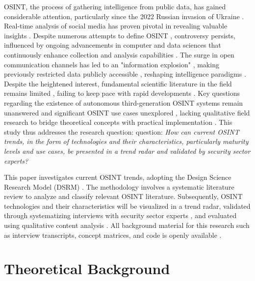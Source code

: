\documentclass[10pt]{article}
\begin{document}
OSINT, the process of gathering intelligence from public data, has gained considerable attention, particularly since
the 2022 Russian invasion of Ukraine \cite{DosPassos.2017}. Real-time analysis of social media has proven pivotal in revealing
valuable insights \cite{SmithBoyle.24.07.2023}. Despite numerous attempts to define OSINT
\cite{Hwang.2022, PastorGalindo.2020, Yogish.2021}, controversy persists, influenced by ongoing advancements in computer and
data sciences that continuously enhance collection and analysis capabilities \cite{Ghioni.2023, Williams.2018}.
The surge in open communication channels has led to an "information explosion" \cite{DosPassos.2017, Hwang.2022, Yogish.2021},
making previously restricted data publicly accessible \cite{Hwang.2022, Williams.2018}, reshaping intelligence paradigms \cite{Dokman.2020}.
Despite the heightened interest, fundamental scientific literature in the field remains limited \cite{HerreraCubides.2020},
failing to keep pace with rapid developments \cite{Ghioni.2023, Williams.2018}. Key questions regarding the existence of
autonomous third-generation OSINT systems \cite{PastorGalindo.2019, PastorGalindo.2020} remain unanswered
\cite{Ghioni.2023, PastorGalindo.2020, Yogish.2021} and significant OSINT use cases unexplored
\cite{AlKilani.2021, Dokman.2020, Ghioni.2023}, lacking qualitative field research to bridge theoretical concepts with
practical implementation \cite{HerreraCubides.2020, PastorGalindo.2019}. This study thus addresses the research question:
question: \textit{How can current OSINT trends, in the form of technologies and their characteristics, particularly maturity levels and use cases, be presented in a trend radar and validated by security sector experts?}


This paper investigates current OSINT trends, adopting the Design Science Research Model (DSRM) \cite{Peffers.2007}.
The methodology involves a systematic literature review \cite{Webster.2002} to analyze and classify relevant OSINT literature.
Subsequently, OSINT technologies and their characteristics will be visualized in a trend radar, validated through systematizing
interviews with security sector experts \cite{Bogner.2014}, and evaluated using qualitative content analysis \cite{Billings.1997}. All background material for this research such as interview transcripts, concept matrices, and code is openly available \cite{kayser2024}.


\section{Theoretical Background} \label{sec:theoreticalbackground}
\end{document}
